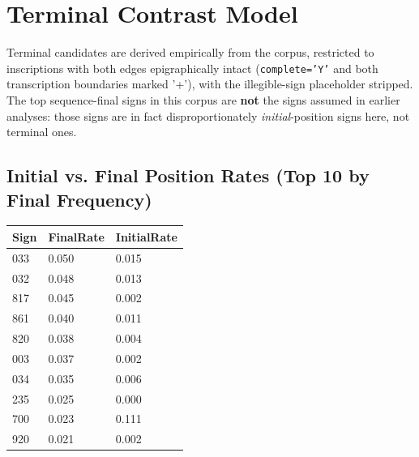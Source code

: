 \section{Terminal Contrast Model}

Terminal candidates are derived empirically from the corpus, restricted to
inscriptions with both edges epigraphically intact (\texttt{complete='Y'}
and both transcription boundaries marked '+'), with the illegible-sign
placeholder stripped. The top sequence-final signs in this corpus are
\textbf{not} the signs assumed in earlier analyses: those signs are in fact
disproportionately \emph{initial}-position signs here, not terminal ones.

\subsection{Initial vs. Final Position Rates (Top 10 by Final Frequency)}
\begin{tabular}{lll}
\toprule
\textbf{Sign} & \textbf{FinalRate} & \textbf{InitialRate} \\
\midrule
033 & 0.050 & 0.015 \\
032 & 0.048 & 0.013 \\
817 & 0.045 & 0.002 \\
861 & 0.040 & 0.011 \\
820 & 0.038 & 0.004 \\
003 & 0.037 & 0.002 \\
034 & 0.035 & 0.006 \\
235 & 0.025 & 0.000 \\
700 & 0.023 & 0.111 \\
920 & 0.021 & 0.002 \\
\bottomrule
\end{tabular}

